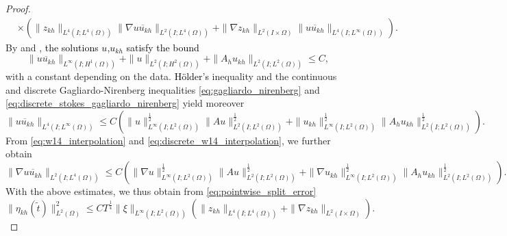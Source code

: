 \documentclass{m2an}
\newcommand\blue[1]{\textcolor{black}{#1}}
\newcommand{\uukh}{\overline{uu_{kh}}}
\newcommand{\ukh}{u_{kh}}
\newcommand{\zkh}{z_{kh}}
\newcommand{\LtwoLtwo}{L^2(I \times \Omega)}
\begin{document}
\begin{proof}
\begin{equation}
\begin{aligned}
        & \times \left(\|\zkh\|_{L^4(I;L^4(\Omega))}\|\nabla \uukh\|_{L^2(I;L^4(\Omega))}
                   +  \|\nabla \zkh\|_{\LtwoLtwo}\|\uukh\|_{L^4(I;L^\infty(\Omega))} \right).
  \end{aligned}
  \end{equation}
  By  and , 
  \blue{the solutions $u$,$\ukh$ satisfy the bound} 
    \begin{equation*}
      \|\uukh\|_{L^\infty(I;H^1(\Omega))} +
      \|u\|_{L^2(I;H^2(\Omega))} +
      \|A_h \ukh\|_{L^2(I;L^2(\Omega))} \le C,
    \end{equation*}
    with a constant depending on the data.
    \blue{Hölder's} inequality and the continuous and discrete Gagliardo-Nirenberg inequalities 
    \eqref{eq:gagliardo_nirenberg} and \eqref{eq:discrete_stokes_gagliardo_nirenberg} yield moreover 
    \begin{equation*}
      \|\uukh\|_{L^4(I;L^\infty(\Omega))} 
      \le C \left(\|u\|_{L^\infty(I;L^2(\Omega))}^{\frac{1}{2}}\|A u\|_{L^2(I;L^2(\Omega))}^{\frac{1}{2}}
      +\|\ukh\|_{L^\infty(I;L^2(\Omega))}^{\frac{1}{2}} \|A_h \ukh\|_{L^2(I;L^2(\Omega))}^{\frac{1}{2}}\right).
    \end{equation*}
    From \eqref{eq:w14_interpolation} and \eqref{eq:discrete_w14_interpolation}, we further obtain
    \begin{equation*}
      \|\nabla \uukh\|_{L^2(I;L^4(\Omega))} 
      \le C \left(\|\nabla u\|_{L^\infty(I;L^2(\Omega))}^{\frac{1}{2}}\|A u\|_{L^2(I;L^2(\Omega))}^{\frac{1}{2}}
      + \|\nabla \ukh\|_{L^\infty(I;L^2(\Omega))}^{\frac{1}{2}} \|A_h \ukh\|_{L^2(I;L^2(\Omega))}^{\frac{1}{2}}
    \right).
    \end{equation*}
    With the above estimates, we thus obtain from \eqref{eq:pointwise_split_error}
    \begin{equation*}
    \|\eta_{kh}(\tilde t)\|^2_{L^2(\Omega)} 
    \le C   T^{\frac{1}{4}}\|\xi\|_{L^\infty(I;L^2(\Omega))}
    \left(\|\zkh\|_{L^4(I;L^4(\Omega))} +  \|\nabla \zkh\|_{\LtwoLtwo}\right).
    \end{equation*}

\end{proof}
\end{document}
